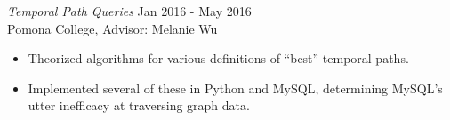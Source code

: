 {\sl Temporal Path Queries} \hfill Jan 2016 - May 2016 \\
Pomona College, Advisor: Melanie Wu
\begin{itemize} \itemsep -2pt
  \item Theorized algorithms for various definitions of ``best'' temporal paths.
  \item Implemented several of these  in Python and MySQL, determining
    MySQL's utter inefficacy at traversing graph data.
\end{itemize}
